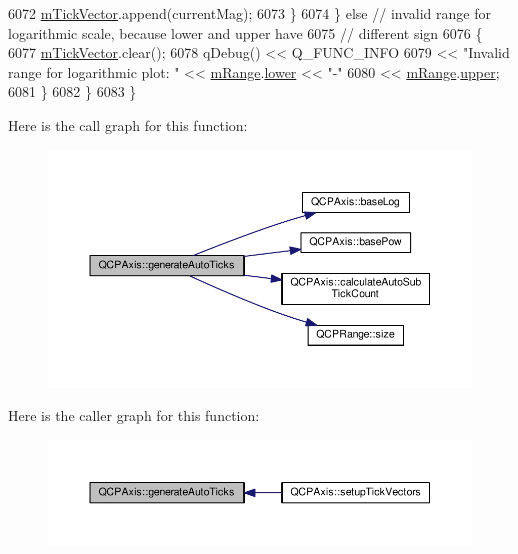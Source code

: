 \begin{DoxyCode}
6072         \hyperlink{class_q_c_p_axis_aae0f9b9973b85be601200f00f5825087}{mTickVector}.append(currentMag);
6073       \}
6074     \} \textcolor{keywordflow}{else} \textcolor{comment}{// invalid range for logarithmic scale, because lower and upper have}
6075            \textcolor{comment}{// different sign}
6076     \{
6077       \hyperlink{class_q_c_p_axis_aae0f9b9973b85be601200f00f5825087}{mTickVector}.clear();
6078       qDebug() << Q\_FUNC\_INFO
6079                << \textcolor{stringliteral}{"Invalid range for logarithmic plot: "} << \hyperlink{class_q_c_p_axis_a1ee36773c49062d751560e11f90845f7}{mRange}.\hyperlink{class_q_c_p_range_aa3aca3edb14f7ca0c85d912647b91745}{lower} << \textcolor{stringliteral}{"-"}
6080                << \hyperlink{class_q_c_p_axis_a1ee36773c49062d751560e11f90845f7}{mRange}.\hyperlink{class_q_c_p_range_ae44eb3aafe1d0e2ed34b499b6d2e074f}{upper};
6081     \}
6082   \}
6083 \}
\end{DoxyCode}


Here is the call graph for this function\+:\nopagebreak
\begin{figure}[H]
\begin{center}
\leavevmode
\includegraphics[width=350pt]{class_q_c_p_axis_a626eef437c874148df1a5ac78506d463_cgraph}
\end{center}
\end{figure}




Here is the caller graph for this function\+:\nopagebreak
\begin{figure}[H]
\begin{center}
\leavevmode
\includegraphics[width=350pt]{class_q_c_p_axis_a626eef437c874148df1a5ac78506d463_icgraph}
\end{center}
\end{figure}


